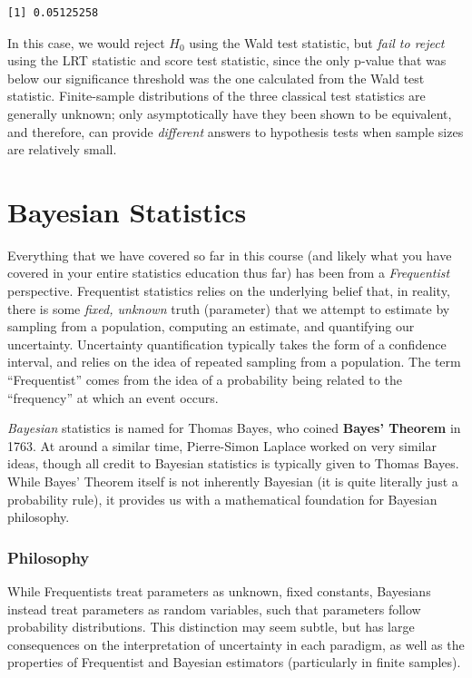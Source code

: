 \documentclass[
  letterpaper,
  DIV=11,
  numbers=noendperiod]{scrreprt}
\begin{document}
\begin{verbatim}
[1] 0.05125258
\end{verbatim}

In this case, we would reject \(H_0\) using the Wald test statistic, but
\emph{fail to reject} using the LRT statistic and score test statistic,
since the only p-value that was below our significance threshold was the
one calculated from the Wald test statistic. Finite-sample distributions
of the three classical test statistics are generally unknown; only
asymptotically have they been shown to be equivalent, and therefore, can
provide \emph{different} answers to hypothesis tests when sample sizes
are relatively small.


\chapter{Bayesian Statistics}\label{bayesian-statistics}

Everything that we have covered so far in this course (and likely what
you have covered in your entire statistics education thus far) has been
from a \emph{Frequentist} perspective. Frequentist statistics relies on
the underlying belief that, in reality, there is some \emph{fixed,
unknown} truth (parameter) that we attempt to estimate by sampling from
a population, computing an estimate, and quantifying our uncertainty.
Uncertainty quantification typically takes the form of a confidence
interval, and relies on the idea of repeated sampling from a population.
The term ``Frequentist'' comes from the idea of a probability being
related to the ``frequency'' at which an event occurs.

\emph{Bayesian} statistics is named for Thomas Bayes, who coined
\textbf{Bayes' Theorem} in 1763. At around a similar time, Pierre-Simon
Laplace worked on very similar ideas, though all credit to Bayesian
statistics is typically given to Thomas Bayes. While Bayes' Theorem
itself is not inherently Bayesian (it is quite literally just a
probability rule), it provides us with a mathematical foundation for
Bayesian philosophy.

\subsection*{Philosophy}\label{philosophy}

While Frequentists treat parameters as unknown, fixed constants,
Bayesians instead treat parameters as random variables, such that
parameters follow probability distributions. This distinction may seem
subtle, but has large consequences on the interpretation of uncertainty
in each paradigm, as well as the properties of Frequentist and Bayesian
estimators (particularly in finite samples).
\end{document}
